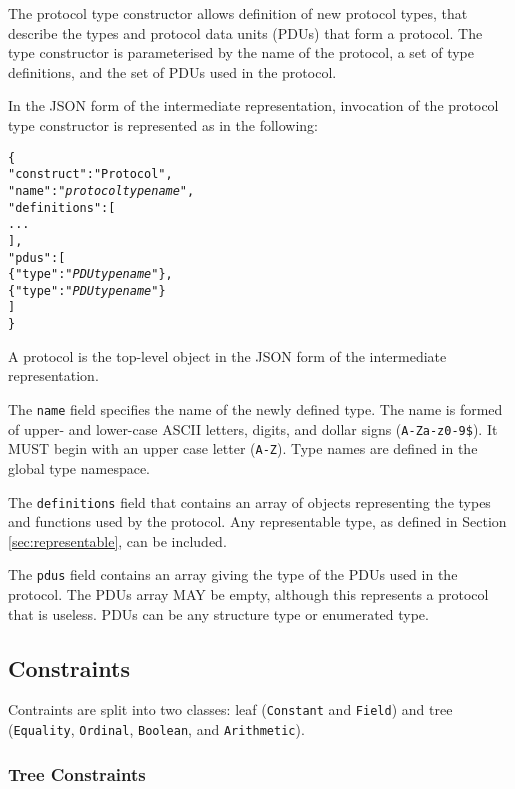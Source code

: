 \documentclass[10pt,twocolumn,a4paper]{article}
\newcommand{\code}[1]{\texttt{#1}}
\begin{document}
The protocol type constructor allows definition of new protocol types, that
describe the types and protocol data units (PDUs) that form a protocol. The
type constructor is parameterised by the name of the protocol, a set of
type definitions, and the set of PDUs used in the protocol.

In the JSON form of the intermediate representation, invocation of the
protocol type constructor is represented as in the following:
\footnotesize
\begin{alltt}
  \{
    "construct"   : "Protocol",
    "name"        : "\emph{protocol type name}",
    "definitions" : [
                      ...
                    ],
    "pdus"        : [
      \{"type" : "\emph{PDU type name}"\},
      \{"type" : "\emph{PDU type name}"\}
    ]
  \}
\end{alltt}
\normalsize
A protocol is the top-level object in the JSON form of the intermediate
representation.

The \code{name} field specifies the name of the newly defined type. The
name is formed of upper- and lower-case ASCII letters, digits, and dollar
signs (\code{A-Za-z0-9\$}).  It MUST begin with an upper case letter
(\code{A-Z}). Type names are defined in the global type namespace.

The \code{definitions} field that contains an array of objects representing
the types and functions used by the protocol. Any representable type, as
defined in Section \ref{sec:representable}, can be included.

The \code{pdus} field contains an array giving the type of the PDUs used
in the protocol. The PDUs array MAY be empty, although this represents a
protocol that is useless. PDUs can be any structure type or enumerated
type. 

\subsection{Constraints}
\label{sec:constraints}

Contraints are split into two classes: leaf (\texttt{Constant} and \texttt{Field}) and
tree (\texttt{Equality}, \texttt{Ordinal}, \texttt{Boolean}, and \texttt{Arithmetic}). 

\subsubsection{Tree Constraints}
\end{document}
